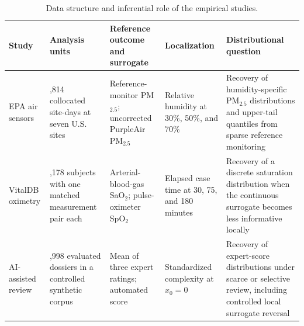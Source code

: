 \begin{table}[!t]
\centering
\small
\setlength{\tabcolsep}{4pt}
\renewcommand{\arraystretch}{1.15}
\caption{Data structure and inferential role of the empirical studies.}
\label{tab:application-data-roles}
\begin{tabular}{@{}>{\RaggedRight\arraybackslash}p{}>{\RaggedRight\arraybackslash}p{}>{\RaggedRight\arraybackslash}p{}>{\RaggedRight\arraybackslash}p{}>{\RaggedRight\arraybackslash}p{}@{}}
\toprule
Study & Analysis units & Reference outcome and surrogate & Localization & Distributional question \\
\midrule
EPA air sensors
& 2,814 collocated site-days at seven U.S. sites
& Reference-monitor PM$_{2.5}$; uncorrected PurpleAir PM$_{2.5}$
& Relative humidity at 30\%, 50\%, and 70\%
& Recovery of humidity-specific PM$_{2.5}$ distributions and upper-tail quantiles from sparse reference monitoring \\
VitalDB oximetry
& 3,178 subjects with one matched measurement pair each
& Arterial-blood-gas SaO$_2$; pulse-oximeter SpO$_2$
& Elapsed case time at 30, 75, and 180 minutes
& Recovery of a discrete saturation distribution when the continuous surrogate becomes less informative locally \\
AI-assisted review
& 2,998 evaluated dossiers in a controlled synthetic corpus
& Mean of three expert ratings; automated score
& Standardized complexity at $x_0=0$
& Recovery of expert-score distributions under scarce or selective review, including controlled local surrogate reversal \\
\bottomrule
\end{tabular}
\end{table}
